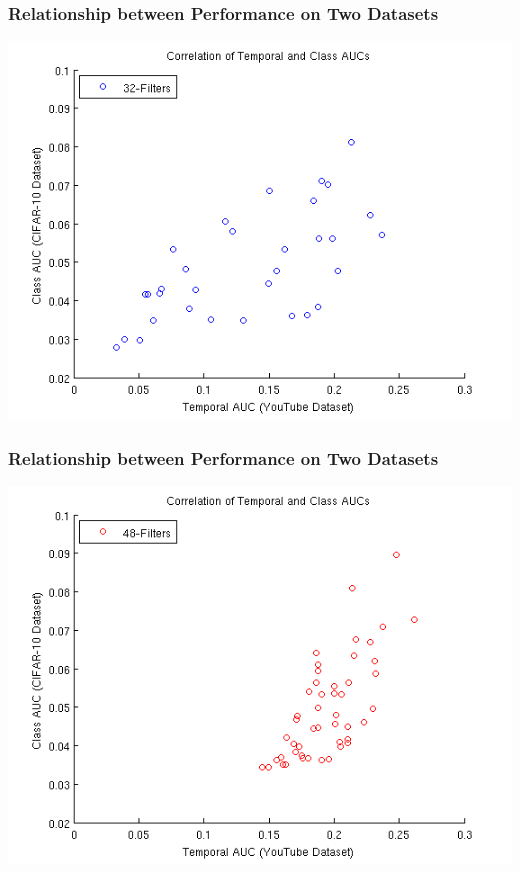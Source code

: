 \documentclass{beamer}
\begin{document}
\begin{frame}
\frametitle{Relationship between Performance on Two Datasets} 
\centerline{\includegraphics[scale=0.55]{./images/TAE/AUC_32.png}}
\end{frame}

\begin{frame}
\frametitle{Relationship between Performance on Two Datasets} 
\centerline{\includegraphics[scale=0.55]{./images/TAE/AUC_48.png}}
\end{frame}
\end{document}
